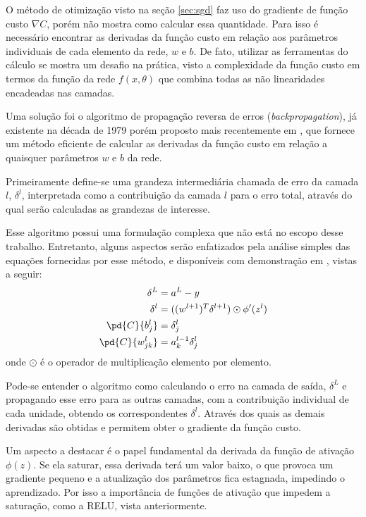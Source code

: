 O método de otimização visto na seção \ref{sec:sgd} faz uso do gradiente de função custo $\nabla C$, porém não mostra como calcular essa quantidade. Para isso é necessário encontrar as derivadas da função custo em relação aos parâmetros individuais de cada elemento da rede, $w$ e $b$. De fato, utilizar as ferramentas do cálculo se mostra um desafio na prática, visto a complexidade da função custo em termos da função da rede $f(x, \theta)$ que combina todas as não linearidades encadeadas nas camadas. 

Uma solução foi o algoritmo de propagação reversa de erros (\textit{backpropagation}), já existente na década de 1979 porém proposto mais recentemente em \cite{backpropagation}, que fornece um método eficiente de calcular as derivadas da função custo em relação a quaisquer parâmetros $w$ e $b$ da rede.

Primeiramente define-se uma grandeza intermediária chamada de erro da camada $l$, $\delta^l$, interpretada como a contribuição da camada $l$ para o erro total, através do qual serão calculadas as grandezas de interesse.

Esse algoritmo possui uma formulação complexa que não está no escopo desse trabalho. Entretanto, alguns aspectos serão enfatizados pela análise simples das equações fornecidas por esse método, e disponíveis com demonstração em \cite{NeuralNetsDeep}, vistas a seguir:
\begin{align}
\delta^L &= a^L - y \\ 
\delta^l &= ((w^{l+1})^T\delta^{l+1}) \odot \phi^\prime(z^l) \\
\pd{C}{b_j^l{}} &= \delta_j^l \\ 
\pd{C}{w_{jk}^l{}} &= a_k^{l-1} \delta_j^l 
\end{align}
onde $\odot$ é o operador de multiplicação elemento por elemento.

Pode-se entender o algoritmo como calculando o erro na camada de saída, $\delta^L$ e propagando esse erro para as outras camadas, com a contribuição individual de cada unidade, obtendo os correspondentes $\delta^l$. Através dos quais as demais derivadas são obtidas e permitem obter o gradiente da função custo. 

Um aspecto a destacar é o papel fundamental da derivada da função de ativação $\phi(z)$. Se ela saturar, essa derivada terá um valor baixo, o que provoca um gradiente pequeno e a atualização dos parâmetros fica estagnada, impedindo o aprendizado. Por isso a importância de funções de ativação que impedem a saturação, como a RELU, vista anteriormente.

